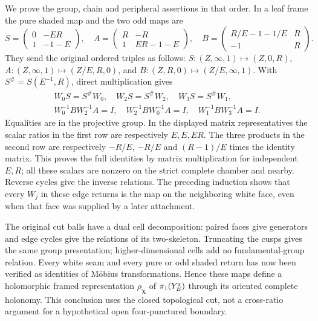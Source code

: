 We prove the group, chain and peripheral assertions in that order.
In a leaf frame the pure shaded map and the two odd maps are
\begin{equation}\label{sm:shaded}
 S=\begin{pmatrix}0&-ER\\1&-1-E\end{pmatrix},\quad
 A=\begin{pmatrix}R&-R\\1&ER-1-E\end{pmatrix},\quad
 B=\begin{pmatrix}R/E-1-1/E&R\\-1&R\end{pmatrix}.
\end{equation}
They send the original ordered triples as follows:
$S:(Z,\infty,1)\mapsto(Z,0,R)$,
$A:(Z,\infty,1)\mapsto(Z/E,R,0)$, and
$B:(Z,R,0)\mapsto(Z/E,\infty,1)$.
With $S^\#=S(E^{-1},R)$, direct multiplication gives
\begin{equation}\label{sm:edge-words}
\begin{gathered}
 W_0S=S^\#W_0,\quad W_2S=S^\#W_2,\quad W_3S=S^\#W_1,\\
 W_0^{-1}BW_2^{-1}A=I,\quad
 W_2^{-1}BW_0^{-1}A=I,\quad W_1^{-1}BW_3^{-1}A=I .
\end{gathered}
\end{equation}
Equalities are in the projective group. In the displayed matrix
representatives the scalar ratios in the first row are respectively
$E,E,ER$. The three products in the second row are respectively
$-R/E$, $-R/E$ and $(R-1)/E$ times the identity matrix.
This proves the full identities by matrix multiplication for
independent $E,R$; all these scalars are nonzero on the strict
complete chamber and nearby. Reverse cycles give the inverse
relations.
The preceding induction shows that every $W_j$ in these edge returns
is the map on the neighboring white face, even when that face was
supplied by a later attachment.

The original cut balls have a dual cell decomposition: paired faces
give generators and edge cycles give the relations of its
two-skeleton. Truncating the cusps gives the same group presentation;
higher-dimensional cells add no fundamental-group relation.
Every white seam and every pure or odd shaded return has now been
verified as identities of Möbius transformations. Hence these maps define a
holomorphic framed representation $\rho_{\boldsymbol\chi}$ of
$\pi_1(Y_E^\varepsilon)$ through its oriented complete holonomy. This
conclusion uses the closed topological cut, not a cross-ratio argument
for a hypothetical open four-punctured boundary.


